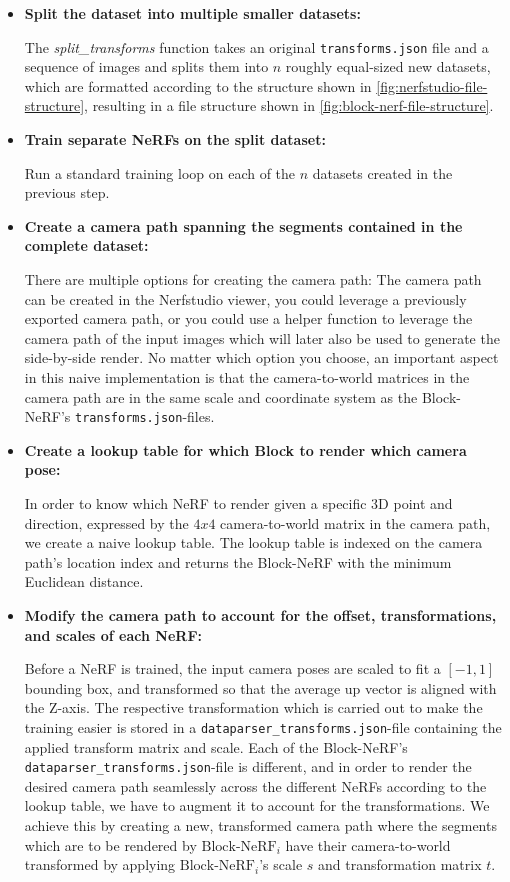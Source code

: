 \begin{itemize}
    \item \textbf{Split the dataset into multiple smaller datasets:} 

    The \textit{split\_transforms} function takes an original \texttt{transforms.json} file and a sequence of images and splits them into $n$ roughly equal-sized new datasets, which are formatted according to the structure shown in \autoref{fig:nerfstudio-file-structure}, resulting in a file structure shown in \autoref{fig:block-nerf-file-structure}.

    \item \textbf{Train separate NeRFs on the split dataset:} 

    Run a standard training loop on each of the $n$ datasets created in the previous step.
    
    \item \textbf{Create a camera path spanning the segments contained in the complete dataset:}
    
    There are multiple options for creating the camera path: The camera path can be created in the Nerfstudio viewer, you could leverage a previously exported camera path, or you could use a helper function to leverage the camera path of the input images which will later also be used to generate the side-by-side render. No matter which option you choose, an important aspect in this naive implementation is that the camera-to-world matrices in the camera path are in the same scale and coordinate system as the Block-NeRF's \texttt{transforms.json}-files.
    
    \item \textbf{Create a lookup table for which Block to render which camera pose:}

    In order to know which NeRF to render given a specific 3D point and direction, expressed by the $4x4$ camera-to-world matrix in the camera path, we create a naive lookup table. The lookup table is indexed on the camera path's location index and returns the Block-NeRF with the minimum Euclidean distance.

    \item \textbf{Modify the camera path to account for the offset, transformations, and scales of each NeRF:}
    
    Before a NeRF is trained, the input camera poses are scaled to fit a $[-1, 1]$ bounding box, and transformed so that the average up vector is aligned with the Z-axis. The respective transformation which is carried out to make the training easier is stored in a \texttt{dataparser\_transforms.json}-file containing the applied transform matrix and scale. Each of the Block-NeRF's \texttt{dataparser\_transforms.json}-file is different, and in order to render the desired camera path seamlessly across the different NeRFs according to the lookup table, we have to augment it to account for the transformations. We achieve this by creating a new, transformed camera path where the segments which are to be rendered by $\text{Block-NeRF}_i$ have their camera-to-world transformed by applying $\text{Block-NeRF}_i$'s scale $s$ and transformation matrix $t$. 
    

\end{itemize}
